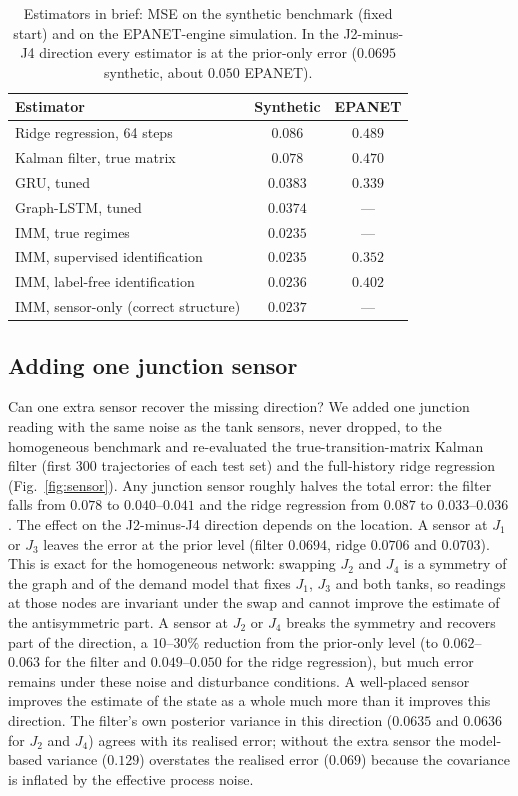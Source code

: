 \documentclass[conference]{IEEEtran}
\begin{document}
\begin{table}[t]
\centering
\caption{Estimators in brief: MSE on the synthetic benchmark (fixed start) and on the EPANET-engine simulation. In the J2-minus-J4 direction every estimator is at the prior-only error ($0.0695$ synthetic, about $0.050$ EPANET).}
\label{tab:estimators_brief}
\small
\begin{tabular}{lcc}
\toprule
Estimator & Synthetic & EPANET \\
\midrule
Ridge regression, 64 steps & $0.086$ & $0.489$ \\
Kalman filter, true matrix & $0.078$ & $0.470$ \\
GRU, tuned & $0.0383$ & $0.339$ \\
Graph-LSTM, tuned & $0.0374$ & --- \\
IMM, true regimes & $0.0235$ & --- \\
IMM, supervised identification & $0.0235$ & $0.352$ \\
IMM, label-free identification & $0.0236$ & $0.402$ \\
IMM, sensor-only (correct structure) & $0.0237$ & --- \\
\bottomrule
\end{tabular}
\end{table}

\subsection{Adding one junction sensor}
\label{sec:sensor}

Can one extra sensor recover the missing direction? We added one junction reading with the same noise as the tank sensors, never dropped, to the homogeneous benchmark and re-evaluated the true-transition-matrix Kalman filter (first 300 trajectories of each test set) and the full-history ridge regression (Fig.~\ref{fig:sensor}). Any junction sensor roughly halves the total error: the filter falls from $0.078$ to $0.040$--$0.041$ and the ridge regression from $0.087$ to $0.033$--$0.036$. The effect on the J2-minus-J4 direction depends on the location. A sensor at $J_1$ or $J_3$ leaves the error at the prior level (filter $0.0694$, ridge $0.0706$ and $0.0703$). This is exact for the homogeneous network: swapping $J_2$ and $J_4$ is a symmetry of the graph and of the demand model that fixes $J_1$, $J_3$ and both tanks, so readings at those nodes are invariant under the swap and cannot improve the estimate of the antisymmetric part. A sensor at $J_2$ or $J_4$ breaks the symmetry and recovers part of the direction, a $10$--$30\%$ reduction from the prior-only level (to $0.062$--$0.063$ for the filter and $0.049$--$0.050$ for the ridge regression), but much error remains under these noise and disturbance conditions. A well-placed sensor improves the estimate of the state as a whole much more than it improves this direction. The filter's own posterior variance in this direction ($0.0635$ and $0.0636$ for $J_2$ and $J_4$) agrees with its realised error; without the extra sensor the model-based variance ($0.129$) overstates the realised error ($0.069$) because the covariance is inflated by the effective process noise.
\end{document}
